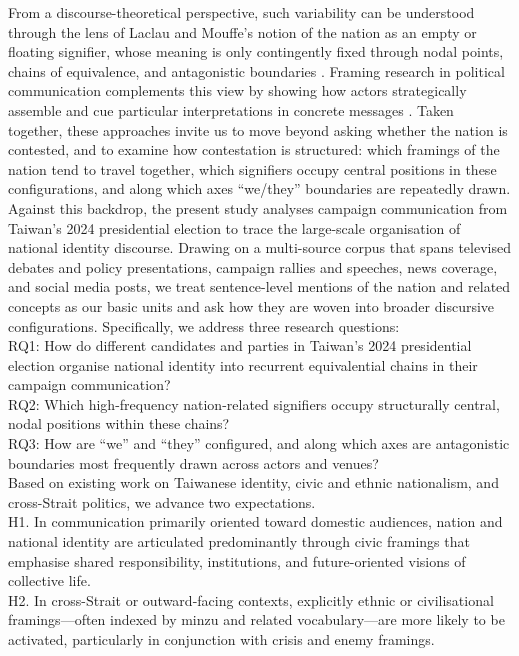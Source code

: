 \documentclass[man,12pt]{apa7}
\begin{document}
From a discourse-theoretical perspective, such variability can be understood through the lens of Laclau and Mouffe's notion of the nation as an empty or floating signifier, 
whose meaning is only contingently fixed through nodal points, chains of equivalence, and antagonistic boundaries \parencite{laclau1985,laclau2005}. 
Framing research in political communication complements this view by showing how actors strategically assemble and cue particular interpretations in concrete messages \parencite{chong2007}. 
Taken together, these approaches invite us to move beyond asking whether the nation is contested, and to examine how contestation is structured: 
which framings of the nation tend to travel together, which signifiers occupy central positions in these configurations, and along which axes ``we/they'' boundaries are repeatedly drawn.\\%
Against this backdrop, the present study analyses campaign communication from Taiwan's 2024 presidential election to trace the large-scale organisation of national identity discourse. 
Drawing on a multi-source corpus that spans televised debates and policy presentations, campaign rallies and speeches, news coverage, and social media posts, 
we treat sentence-level mentions of the nation and related concepts as our basic units and ask how they are woven into broader discursive configurations. 
Specifically, we address three research questions:\\%
RQ1: How do different candidates and parties in Taiwan's 2024 presidential election organise national identity into recurrent equivalential chains in their campaign communication?\\%
RQ2: Which high-frequency nation-related signifiers occupy structurally central, nodal positions within these chains?\\%
RQ3: How are ``we'' and ``they'' configured, and along which axes are antagonistic boundaries most frequently drawn across actors and venues?\\%
Based on existing work on Taiwanese identity, civic and ethnic nationalism, and cross-Strait politics, we advance two expectations.\\%
H1. In communication primarily oriented toward domestic audiences, nation and national identity are articulated predominantly through civic framings that emphasise shared responsibility, institutions, and future-oriented visions of collective life.\\%
H2. In cross-Strait or outward-facing contexts, explicitly ethnic or civilisational framings—often indexed by minzu and related vocabulary—are more likely to be activated, particularly in conjunction with crisis and enemy framings.\\%
\end{document}
